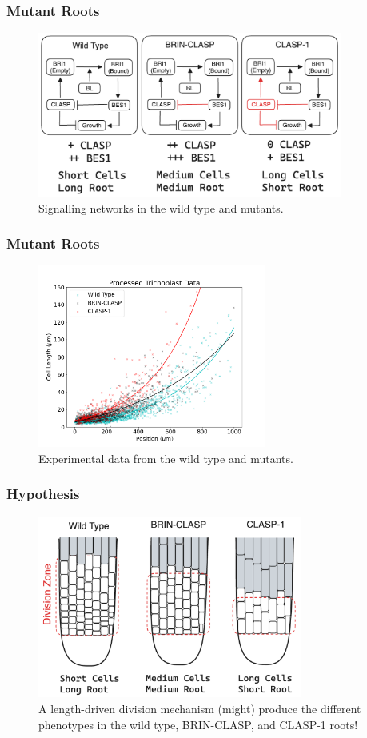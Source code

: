 \documentclass{beamer}
\begin{document}
\begin{frame}
\frametitle{Mutant Roots}
\begin{figure}
    \centering
    \includegraphics[width=10cm]{mutant-diagram.png}
    \caption{Signalling networks in the wild type and mutants.}
\end{figure}
\end{frame}

\begin{frame}
\frametitle{Mutant Roots}
\begin{figure}
    \centering
    \includegraphics[height=6cm]{data-trichoblast.png}
    \caption{Experimental data from the wild type and mutants.}
\end{figure}
\end{frame}

\begin{frame}
\frametitle{Hypothesis}

\begin{figure}
    \centering
    \includegraphics[height=6cm]{mutant-phenotypes.png}
    \caption{A length-driven division mechanism (might) produce the different phenotypes in the wild type, BRIN-CLASP, and CLASP-1 roots!}
\end{figure}
\end{frame}
\end{document}
